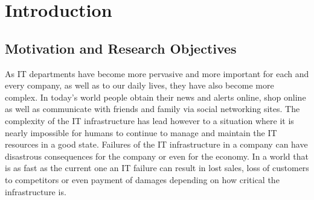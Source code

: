 
\chapter{Introduction} %
\label{Chapter1}

\section{Motivation and Research Objectives}

As IT departments have become more pervasive and more important for each and every company, as well as to our daily lives, they have also become more complex. In today's world people obtain their news and alerts online, shop online as well as communicate with friends and family via social networking sites. The complexity of the IT infrastructure has lead however to a situation where it is nearly impossible for humans to continue to manage and maintain the IT resources in a good state. Failures of the IT infrastructure in a company can have disastrous consequences for the company or even for the economy. In a world that is as fast as the current one an IT failure can result in lost sales, loss of customers to competitors or even payment of damages depending on how critical the infrastructure is.

